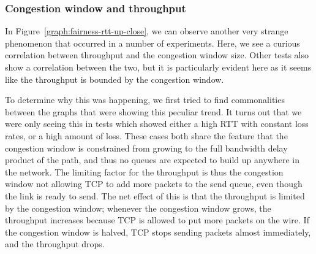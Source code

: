 \subsubsection{Congestion window and throughput}

In Figure~\ref{graph:fairness-rtt-up-close}, we can observe another very strange
phenomenon that occurred in a number of experiments. Here, we see a curious
correlation between throughput and the congestion window size. Other tests also
show a correlation between the two, but it is particularly evident here as it 
seems like the throughput is bounded by the congestion window.

To determine why this was happening, we first tried to find commonalities
between the graphs that were showing this peculiar trend. It turns out that we
were only seeing this in tests which showed either a high RTT with constant loss
rates, or a high amount of loss. These cases both share the feature that the
congestion window is constrained from growing to the full bandwidth delay
product of the path, and thus no queues are expected to build up anywhere in the
network. The limiting factor for the throughput is thus the congestion window not
allowing TCP to add more packets to the send queue, even though the link is
ready to send. The net effect of this is that the throughput is limited by the
congestion window; whenever the congestion window grows, the throughput
increases because TCP is allowed to put more packets on the wire. If the
congestion window is halved, TCP stops sending packets almost immediately, and
the throughput drops.

